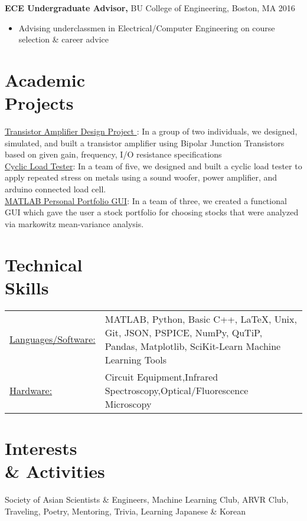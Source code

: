 \documentclass[margin]{res}
\begin{document}
\begin{resume}
\begin{itemize}
		 \end{itemize}
   {\bf ECE Undergraduate Advisor,} BU College of Engineering, Boston, MA    \hfill         2016 
                \begin{itemize} \itemsep -2pt
              \item Advising underclassmen in Electrical/Computer Engineering on course selection \& career advice 
                 

		 \end{itemize}
		

\section{Academic \\ Projects} 
\underline{Transistor Amplifier Design Project }: In a group of two individuals, we designed, simulated, and built a transistor amplifier using Bipolar Junction Transistors based on given gain, frequency, I/O resistance specifications  \\
\underline{Cyclic Load Tester}: In a team of five, we designed and built a cyclic load tester to apply repeated stress on metals using a sound woofer, power amplifier, and arduino connected load cell. \\
\underline{MATLAB Personal Portfolio GUI}: In a team of three, we created a functional GUI which gave the user a stock portfolio for choosing stocks that were analyzed via markowitz mean-variance analysis. 
 

\section{Technical \\ Skills}
   \begin{tabular}{l p{4.5in}}
    \underline{Languages/Software:} & MATLAB, Python, Basic C++, LaTeX, Unix, Git, JSON, PSPICE, NumPy, QuTiP, Pandas, Matplotlib,  SciKit-Learn Machine Learning Tools\\
     \underline{Hardware:} & Circuit Equipment,Infrared Spectroscopy,Optical/Fluorescence Microscopy \\
 \end{tabular}
 
\section{Interests \\ \& Activities}
Society of Asian Scientists \& Engineers, Machine Learning Club, ARVR Club, Traveling, Poetry, Mentoring, Trivia, Learning Japanese \& Korean
\end{resume} 
\end{document}
